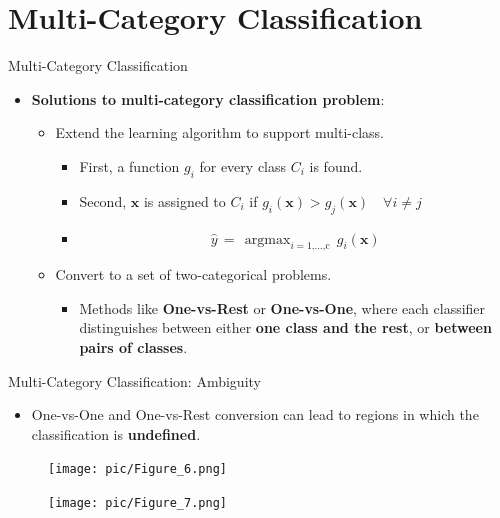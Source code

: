 \documentclass[serif, aspectratio=169]{beamer}
\DeclareMathOperator*{\argmax}{argmax}
\begin{document}
\section{Multi-Category Classification}

\begin{frame}{Multi-Category Classification}
    \begin{itemize}
        \item \textbf{Solutions to multi-category classification problem}:
        \medskip
        \begin{itemize}\itemsep1.5em
            \item Extend the learning algorithm to support multi-class.
            \medskip
            \begin{itemize}\itemsep1em
                \item First, a function \(g_i\) for every class \(C_i\) is found.
                \item Second, \(\mathbf{x}\) is assigned to \(C_i\) if \(g_i(\mathbf{x}) > g_j(\mathbf{x}) \quad \forall i \neq j\)
                \item[] \[\hat{y} \, = \, \argmax_{i=\text{1,...,c}} \, g_i(\mathbf{x})\]
            \end{itemize}
            \item Convert to a set of two-categorical problems.
            \medskip
            \begin{itemize}
                \item Methods like \textbf{One-vs-Rest} or \textbf{One-vs-One}, where each classifier distinguishes between either \textbf{one class and the rest}, or \textbf{between pairs of classes}.
            \end{itemize}
        \end{itemize}
    \end{itemize}
\end{frame}

\begin{frame}{Multi-Category Classification: Ambiguity}
    \begin{itemize}
        \item \justifying One-vs-One and One-vs-Rest conversion can lead to regions in which the classification is \textbf{undefined}.
    \end{itemize}
    \vfill
    \begin{figure}[bh]
        \centering
        \texttt{[image: pic/Figure\_6.png]}
    \end{figure}
    \endminipage
    \begin{figure}[bh]
        \centering
        \texttt{[image: pic/Figure\_7.png]}
    \end{figure}
    \endminipage
    \vfill
\end{frame}
\end{document}
